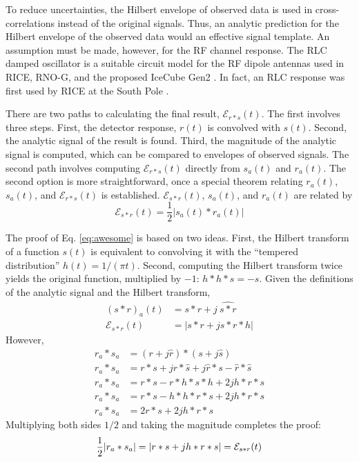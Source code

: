 \documentclass[amsmath,amssymb,aps,prd,10pt,twocolumn,showkeys]{revtex4}
\begin{document}
To reduce uncertainties, the Hilbert envelope of observed data is used in cross-correlations instead of the original signals.  Thus, an analytic prediction for the Hilbert envelope of the observed data would an effective signal template.  An assumption must be made, however, for the RF channel response.  The RLC damped oscillator is a suitable circuit model for the RF dipole antennas used in RICE, RNO-G, and the proposed IceCube Gen2 \cite{10.1088/1748-0221/16/03/p03025,10.48550/arxiv.2008.04323}.  In fact, an RLC response was first used by RICE at the South Pole \cite{10.1103/PhysRevD.85.062004}.

There are two paths to calculating the final result, $\mathcal{E}_{r*s}(t)$.  The first involves three steps.  First, the detector response, $r(t)$ is convolved with $s(t)$.  Second, the analytic signal of the result is found.  Third, the magnitude of the analytic signal is computed, which can be compared to envelopes of observed signals.  The second path involves computing $\mathcal{E}_{r*s}(t)$ directly from $s_a(t)$ and $r_a(t)$.  The second option is more straightforward, once a special theorem relating $r_a(t)$, $s_a(t)$, and $\mathcal{E}_{r*s}(t)$ is established.  $\mathcal{E}_{s * r}(t)$, $s_a(t)$, and $r_a(t)$ are related by
\begin{equation}
\mathcal{E}_{s * r}(t) = \frac{1}{2}| s_a (t) * r_a(t)| \label{eq:awesome}
\end{equation}

The proof of Eq. \ref{eq:awesome} is based on two ideas.  First, the Hilbert transform of a function $s(t)$ is equivalent to convolving it with the ``tempered distribution'' $h(t) = 1/(\pi t)$.  Second, computing the Hilbert transform twice yields the original function, multiplied by $-1$: $h * h * s = -s$.  Given the definitions of the analytic signal and the Hilbert transform,
\begin{align}
(s * r)_a (t) &= s * r + j ~ \widehat{s*r} \\
\mathcal{E}_{s * r}(t) &= | s * r + j s * r * h|
\end{align}
However,
\begin{align}
r_a * s_a &= (r + j \hat{r}) * (s + j \hat{s}) \\
r_a * s_a &= r * s + j r * \hat{s} + j \hat{r} * s - \hat{r} * \hat{s} \\
r_a * s_a &= r * s - r * h * s * h + 2 j h * r * s \\
r_a * s_a &= r * s - h * h * r * s + 2 j h * r * s \\
r_a * s_a &= 2 r * s + 2 j h * r * s
\end{align}
Multiplying both sides $1/2$ and taking the magnitude completes the proof:
\begin{equation}
\frac{1}{2} |r_a * s_a| = |r * s + j h * r * s| = \mathcal{E}_{s * r}(t) \\
\end{equation}
\end{document}
